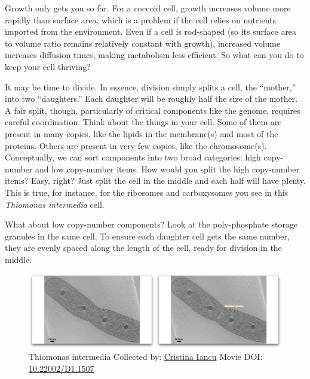 \documentclass[]{tufte-book}
\begin{document}
Growth only gets you so far. For a coccoid cell, growth increases volume
more rapidly than surface area, which is a problem if the cell relies on
nutrients imported from the environment. Even if a cell is rod-shaped
(so its surface area to volume ratio remains relatively constant with
growth), increased volume increases diffusion times, making metabolism
less efficient. So what can you do to keep your cell thriving?

It may be time to divide. In essence, division simply splits a cell, the
``mother,'' into two ``daughters.'' Each daughter will be roughly half
the size of the mother. A fair split, though, particularly of critical
components like the genome, requires careful coordination. Think about
the things in your cell. Some of them are present in many copies, like
the lipids in the membrane(s) and most of the proteins. Others are
present in very few copies, like the chromosome(s). Conceptually, we can
sort components into two broad categories: high copy-number and low
copy-number items. How would you split the high copy-number items? Easy,
right? Just split the cell in the middle and each half will have plenty.
This is true, for instance, for the ribosomes and carboxysomes you see
in this \emph{Thiomonas intermedia} cell.

What about low copy-number components? Look at the poly-phosphate
storage granules in the same cell. To ensure each daughter cell gets the
same number, they are evenly spaced along the length of the cell, ready
for division in the middle.





\begin{figure}
\includegraphics{movie_stills/5_1} \caption[Thiomonas intermedia Collected by:
\protect\hyperlink{cristina_iancu}{Cristina Iancu} Movie DOI:
\href{https://doi.org/10.22002/D1.1507}{10.22002/D1.1507}]{Thiomonas intermedia Collected by:
\protect\hyperlink{cristina_iancu}{Cristina Iancu} Movie DOI:
\href{https://doi.org/10.22002/D1.1507}{10.22002/D1.1507}}\label{fig:5-1}
\end{figure}
\end{document}
